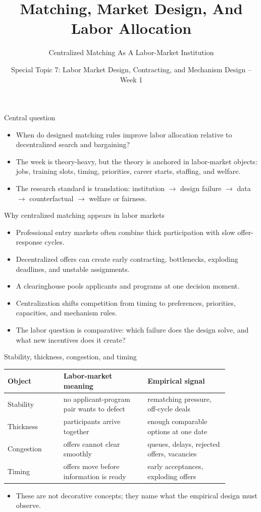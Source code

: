 \documentclass[aspectratio=169,11pt]{beamer}
\title{Matching, Market Design, And Labor Allocation}
\subtitle{Centralized Matching As A Labor-Market Institution}
\author{Special Topic 7: Labor Market Design, Contracting, and Mechanism Design -- Week 1}
\date{}
\begin{document}
\begin{frame}
  \titlepage
\end{frame}

\begin{frame}{Central question}
\begin{itemize}
    \item When do designed matching rules improve labor allocation relative to decentralized search and bargaining?
    \item The week is theory-heavy, but the theory is anchored in labor-market objects: jobs, training slots, timing, priorities, career starts, staffing, and welfare.
    \item The research standard is translation: institution $\rightarrow$ design failure $\rightarrow$ data $\rightarrow$ counterfactual $\rightarrow$ welfare or fairness.
\end{itemize}
\end{frame}

\begin{frame}{Why centralized matching appears in labor markets}
\begin{itemize}
    \item Professional entry markets often combine thick participation with slow offer-response cycles.
    \item Decentralized offers can create early contracting, bottlenecks, exploding deadlines, and unstable assignments.
    \item A clearinghouse pools applicants and programs at one decision moment.
    \item Centralization shifts competition from timing to preferences, priorities, capacities, and mechanism rules.
    \item The labor question is comparative: which failure does the design solve, and what new incentives does it create?
\end{itemize}
\end{frame}

\begin{frame}{Stability, thickness, congestion, and timing}
\small
\begin{tabular}{p{0.22\linewidth} p{0.33\linewidth} p{0.32\linewidth}}
\toprule
Object & Labor-market meaning & Empirical signal \\
\midrule
Stability & no applicant-program pair wants to defect & rematching pressure, off-cycle deals \\
Thickness & participants arrive together & enough comparable options at one date \\
Congestion & offers cannot clear smoothly & queues, delays, rejected offers, vacancies \\
Timing & offers move before information is ready & early acceptances, exploding offers \\
\bottomrule
\end{tabular}
\vspace{0.25cm}
\begin{itemize}
    \item These are not decorative concepts; they name what the empirical design must observe.
\end{itemize}
\end{frame}
\end{document}
